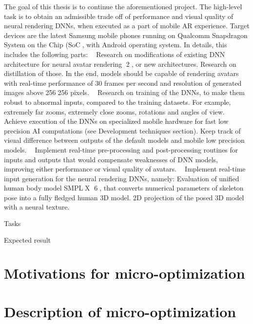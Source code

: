  
 The goal of this thesis is to continue the aforementioned project. The high-level task is
 to obtain an admissible trade off of performance and visual quality of neural rendering
 DNNs, when executed as a part of mobile AR experience. Target devices are the latest
 Samsung mobile phones running on Qualcomm Snapdragon System on the Chip (SoC,
 with Android operating system.
 In details, this includes the following parts:
  Research on modifications of existing DNN architecture for neural avatar rendering
 2, or new architectures. Research on distillation of those. In the end, models
 should be capable of rendering avatars with real-time performance of 30 frames
 per second and resolution of generated images above 256256 pixels.
  Research on training of the DNNs, to make them robust to abnormal inputs,
 compared to the training datasets. For example, extremely far zooms, extremely
 close zooms, rotations and angles of view.
  Achieve execution of the DNNs on specialized mobile hardware for fast low
 precision AI computations (see Development techniques section). Keep track of
 visual difference between outputs of the default models and mobile low precision
 models.
  Implement real-time pre-processing and post-processing routines for inputs and
 outputs that would compensate weaknesses of DNN models, improving either
 performance or visual quality of avatars.
  Implement real-time input generation for the neural rendering DNNs, namely:
 Evaluation of unified human body model SMPLX 6, that converts numerical
 parameters of skeleton pose into a fully fledged human 3D model.
 2D projection of the posed 3D model with a neural texture.
 
 Tasks

Expected result

\section{Motivations for micro-optimization}


\section{Description of micro-optimization}\label{ch1:opts}

